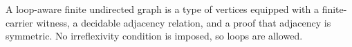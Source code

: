 \begin{definition}
A loop-aware finite undirected graph is a type of vertices equipped with a
finite-carrier witness, a decidable adjacency relation, and a proof that
adjacency is symmetric.  No irreflexivity condition is imposed, so loops are
allowed.
\end{definition}
